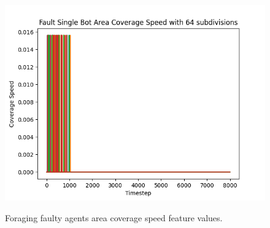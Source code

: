 \documentclass[../../Thesis.tex]{subfiles}
\begin{document}
\begin{figure}[H]
{							\includegraphics[scale=0.22]{../../Images/Experiments/foraging_size6x8_bot_number38_fault_10_percent_rotating_fault_after_1000/Fault_Single_Bot_Area_Coverage_Speed_with_64_subdivisions.png}
					}
					\thinspace
					\caption{Foraging faulty agents area coverage speed feature values.}
					\label{fig:foraging_faulty_area_coverage_speed}
				\end{figure}
			
\end{document}
